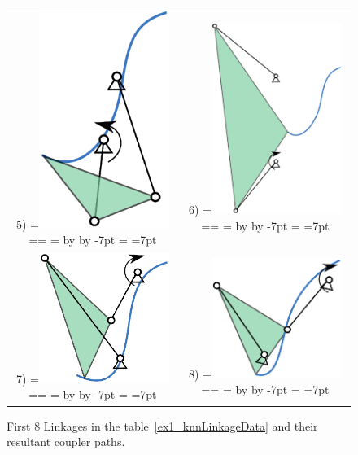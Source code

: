 \documentclass[twocolumn,10pt]{asme2e}
\makeatletter
\newcommand{\putindeepbox}[2][0.7\baselineskip]{{%
    \setbox0=\hbox{#2}%
    \setbox0=\vbox{\noindent\hsize=\wd0\unhbox0}
    \@tempdima=\dp0
    \advance\@tempdima by \ht0
    \advance\@tempdima by -#1\relax
    \dp0=\@tempdima
    \ht0=#1\relax
    \box0
}}
\makeatother
\begin{document}
\begin{figure}
\begin{tabular}{cc}
  5)\putindeepbox[7pt]{\includegraphics[width=120pt]{figure/path_solutions/path_sol5.eps}}
    & 6)\putindeepbox[7pt]{\includegraphics[width=120pt]{figure/path_solutions/path_sol6.eps}} \\
  7)\putindeepbox[7pt]{\includegraphics[width=120pt]{figure/path_solutions/path_sol7.eps}}
    & 8)\putindeepbox[7pt]{\includegraphics[width=120pt]{figure/path_solutions/path_sol8.eps}}\\
\end{tabular}
\caption{First 8 Linkages in the table~\ref{ex1_knnLinkageData} and their resultant coupler paths.}
\label{ex1_solns}
\end{figure}
\end{document}
